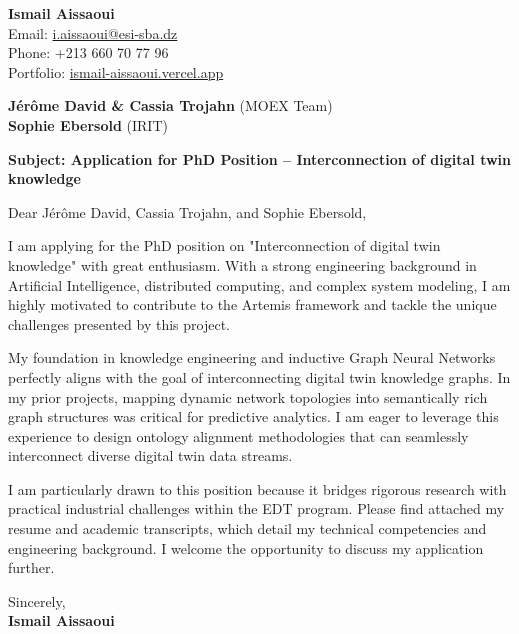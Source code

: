 \documentclass[11pt,a4paper]{article}
\begin{document}
\thispagestyle{empty}

\begin{flushright}
\textbf{Ismail Aissaoui} \\
Email: \href{mailto:i.aissaoui@esi-sba.dz}{i.aissaoui@esi-sba.dz} \\
Phone: +213 660 70 77 96 \\
Portfolio: \href{https://ismail-aissaoui.vercel.app}{ismail-aissaoui.vercel.app}
\end{flushright}

\vspace{1em}

\begin{flushleft}
\textbf{Jérôme David \& Cassia Trojahn} (MOEX Team) \\
\textbf{Sophie Ebersold} (IRIT)
\end{flushleft}

\vspace{1em}
\noindent\textbf{Subject: Application for PhD Position -- Interconnection of digital twin knowledge}
\vspace{1em}

\noindent Dear Jérôme David, Cassia Trojahn, and Sophie Ebersold,

\vspace{1em}
\noindent
I am applying for the PhD position on "Interconnection of digital twin knowledge" with great enthusiasm. With a strong engineering background in Artificial Intelligence, distributed computing, and complex system modeling, I am highly motivated to contribute to the Artemis framework and tackle the unique challenges presented by this project.

\vspace{0.5em}
\noindent
My foundation in knowledge engineering and inductive Graph Neural Networks perfectly aligns with the goal of interconnecting digital twin knowledge graphs. In my prior projects, mapping dynamic network topologies into semantically rich graph structures was critical for predictive analytics. I am eager to leverage this experience to design ontology alignment methodologies that can seamlessly interconnect diverse digital twin data streams.

\vspace{0.5em}
\noindent
I am particularly drawn to this position because it bridges rigorous research with practical industrial challenges within the EDT program. Please find attached my resume and academic transcripts, which detail my technical competencies and engineering background. I welcome the opportunity to discuss my application further.

\vspace{1.5em}
\noindent
Sincerely, \\[0.5em]
\textbf{Ismail Aissaoui}
\end{document}

